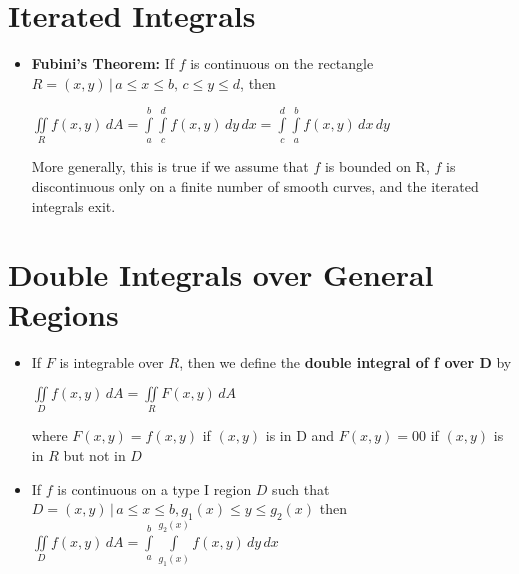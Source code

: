 \documentclass{report}
\begin{document}
	\section{Iterated Integrals}
		\begin{itemize}\addtolength{\leftskip}{2em}
			\item \textbf{Fubini's Theorem:} If $f$ is continuous on the rectangle $R={(x,y)\,|\, a\le x \le b,\, c\le y \le d}$, then
			\begin{center}
			$\iint\limits_{R}f(x,y)\,dA=\int\limits_{a}^{b}\int\limits_{c}^{d}f(x,y)\, dy\,dx=\int\limits_{c}^{d}\int\limits_{a}^{b}f(x,y)\, dx\,dy$
			\end{center}
			More generally, this is true if we assume that $f$ is bounded on R, $f$ is discontinuous only on a finite number of smooth curves, and the iterated integrals exit.
		\end{itemize}
	\section{Double Integrals over General Regions}
		\begin{itemize}\addtolength{\leftskip}{2em}
			\item If $F$ is integrable over $R$, then we define the \textbf{double integral of f over D} by
			\begin{center}
			$\iint\limits_{D}f(x,y)\,dA=\iint\limits_{R}F(x,y)\,dA\quad\quad$ 
			\end{center}
			where $F(x,y)=f(x,y)$ if $(x,y)$ is in D and $F(x,y)=0$0 if $(x,y)$ is in $R$ but not in $D$
			\item If $f$ is continuous on a type I region $D$ such that $D={(x,y)\,|\,a \le x \le b, g_1(x)\le y \le g_2(x)}$
			\subsubitem then $\iint\limits_{D}f(x,y)\,dA=\int\limits_{a}^{b}\int\limits_{g_1(x)}^{g_2(x)}f(x,y)\,dy\,dx$
		\end{itemize}
\end{document}
